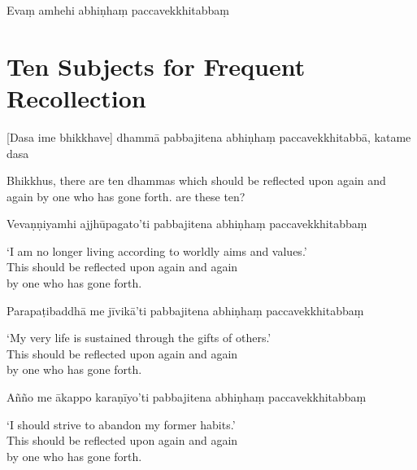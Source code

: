 Evaṃ amhehi abhiṇhaṃ paccavekkhitabbaṃ



\section{Ten Subjects for Frequent Recollection}


\begin{leader}
\end{leader}

[Dasa ime bhikkhave] dhammā pabbajitena abhiṇhaṃ paccavekkhitabbā, katame dasa

\begin{english}
  Bhikkhus, there are ten dhammas which should be reflected upon again and again by one who has gone forth.  are these ten?
\end{english}

Vevaṇṇiyamhi ajjhūpagato'ti pabbajitena abhiṇhaṃ paccavekkhitabbaṃ

\begin{english}
  `I am no longer living according to worldly aims and values.'\\
  This should be reflected upon again and again\\
  by one who has gone forth.
\end{english}

Parapaṭibaddhā me jīvikā'ti pabbajitena abhiṇhaṃ paccavekkhitabbaṃ

\begin{english}
  `My very life is sustained through the gifts of others.'\\
  This should be reflected upon again and again\\
  by one who has gone forth.
\end{english}

Añño me ākappo karaṇīyo'ti pabbajitena abhiṇhaṃ paccavekkhitabbaṃ

\begin{english}
  `I should strive to abandon my former habits.'\\
  This should be reflected upon again and again\\
  by one who has gone forth.
\end{english}

